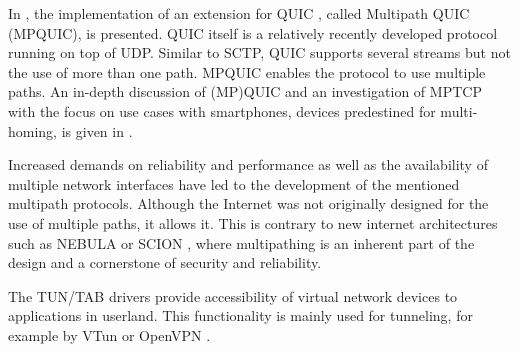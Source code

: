 In \cite{MPQUICPaper}, the implementation of an extension for QUIC \cite{quic-transport-29, QUICChromium}, called Multipath QUIC (MPQUIC), is presented. QUIC itself is a relatively recently developed protocol running on top of UDP. Similar to SCTP, QUIC supports several streams but not the use of more than one path. MPQUIC enables the protocol to use multiple paths. An in-depth discussion of (MP)QUIC and an investigation of MPTCP with the focus on use cases with smartphones, devices predestined for multi-homing, is given in \cite{MPQUICThesis}.

Increased demands on reliability and performance as well as the availability of multiple network interfaces have led to the development of the mentioned multipath protocols.  Although the Internet was not originally designed for the use of multiple paths, it allows it.  This is contrary to new internet architectures such as NEBULA \cite{NEBULA} or SCION \cite{SCIONPaper, SCIONBook}, where multipathing is an inherent part of the design and a cornerstone of security and reliability. 

The TUN/TAB drivers \cite{TUNTAPDriver} provide accessibility of virtual network devices to applications in userland. This functionality is mainly used for tunneling, for example by VTun \cite{VTun} or OpenVPN \cite{OpenVPN}.
